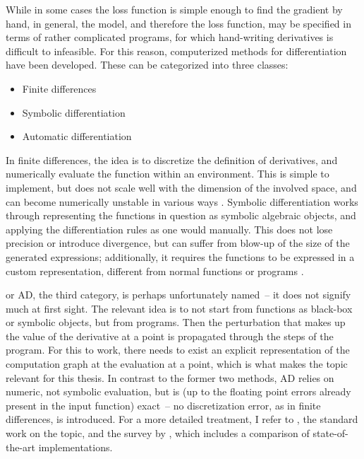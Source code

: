 While in some cases the loss function is simple enough to find the gradient by hand, in general, the
model, and therefore the loss function, may be specified in terms of rather complicated programs,
for which hand-writing derivatives is difficult to infeasible.  For this reason, computerized
methods for differentiation have been developed.  These can be categorized into three classes:
\begin{itemize}
  \firmlist
\item Finite differences
\item Symbolic differentiation
\item Automatic differentiation
\end{itemize}
In finite differences, the idea is to discretize the definition of derivatives, and numerically
evaluate the function within an environment.  This is simple to implement, but does not scale well
with the dimension of the involved space, and can become numerically unstable in various ways
\parencite[section 5.7]{press2007numerical}.  Symbolic differentiation works through representing
the functions in question as symbolic algebraic objects, and applying the differentiation rules as
one would manually.  This does not lose precision or introduce divergence, but can suffer from
blow-up of the size of the generated expressions; additionally, it requires the functions to be
expressed in a custom representation, different from normal functions or programs
\parencite{baydin2018automatic}.

 or AD, the third category, is perhaps unfortunately named~--
it does not signify much at first sight.  The relevant idea is to not start from functions as
black-box or symbolic objects, but from programs.  Then the perturbation that makes up the value of
the derivative at a point is propagated through the steps of the program.  For this to work, there
needs to exist an explicit representation of the computation graph at the evaluation at a point,
which is what makes the topic relevant for this thesis.  In contrast to the former two methods, AD
relies on numeric, not symbolic evaluation, but is (up to the floating point errors already present
in the input function) exact~-- no discretization error, as in finite differences, is introduced.
For a more detailed treatment, I refer to \textcite{griewank2008evaluating}, the standard work on
the topic, and the survey by \textcite{baydin2018automatic}, which includes a comparison of
state-of-the-art implementations.

